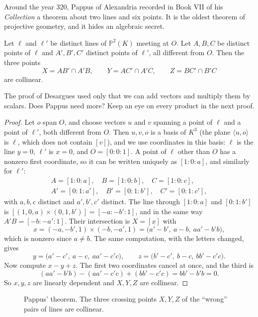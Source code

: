 Around the year 320, Pappus of Alexandria recorded in Book VII of his \emph{Collection} a theorem about two lines and six points. It is the
oldest theorem of projective geometry, and it hides an algebraic secret.

\begin{theorem}[Pappus]\label{geometry:thm:pappusline}
Let $\ell$ and $\ell'$ be distinct lines of $\mathbb P^2(K)$ meeting at $O$. Let $A,B,C$ be distinct points of $\ell$ and $A',B',C'$ distinct
points of $\ell'$, all different from $O$. Then the three points
\[
X=AB'\cap A'B,\qquad Y=AC'\cap A'C,\qquad Z=BC'\cap B'C
\]
are collinear.
\end{theorem}

\begin{think}
The proof of Desargues used only that we can add vectors and multiply them by scalars. Does Pappus need more? Keep an eye on every product in
the next proof.
\end{think}

\begin{proof}
Let $o$ span $O$, and choose vectors $u$ and $v$ spanning a point of $\ell$ and a point of $\ell'$, both different from $O$. Then $u,v,o$ is a basis
of $K^3$ (the plane $\langle u,o\rangle$ is $\ell$, which does not contain $[v]$), and we use coordinates in this basis: $\ell$ is the line $y=0$, $\ell'$ is
$x=0$, and $O=[0:0:1]$. A point of $\ell$ other than $O$ has a nonzero first coordinate, so it can be written uniquely as $[1:0:a]$, and
similarly for $\ell'$:
\[
\begin{gathered}
A=[1:0:a],\quad B=[1:0:b],\quad C=[1:0:c],\\
A'=[0:1:a'],\quad B'=[0:1:b'],\quad C'=[0:1:c'],
\end{gathered}
\]
with $a,b,c$ distinct and $a',b',c'$ distinct. The line through $[1:0:a]$ and $[0:1:b']$ is $[(1,0,a)\times(0,1,b')]=[-a:-b':1]$, and in the same way
$A'B=[-b:-a':1]$. Their intersection is $X=[x]$ with
\[
x=(-a,-b',1)\times(-b,-a',1)=\bigl(a'-b',\ a-b,\ aa'-b'b\bigr),
\]
which is nonzero since $a\ne b$. The same computation, with the letters changed, gives
\[
y=\bigl(a'-c',\ a-c,\ aa'-c'c\bigr),\qquad z=\bigl(b'-c',\ b-c,\ bb'-c'c\bigr).
\]
Now compute $x-y+z$. The first two coordinates cancel at once, and the third is
\[
(aa'-b'b)-(aa'-c'c)+(bb'-c'c)=bb'-b'b=0.
\]
So $x,y,z$ are linearly dependent and $X,Y,Z$ are collinear.
\end{proof}

\begin{figure}[ht]
\centering
{}
\caption{Pappus' theorem. The three crossing points $X,Y,Z$ of the ``wrong'' pairs of lines are collinear.}
\label{geometry:fig:pappus4}
\end{figure}


